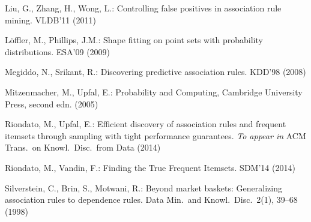 \begin{thebibliography}{33}
Liu, G., Zhang, H., Wong, L.: Controlling false positives in association rule
  mining.
\newblock VLDB'11 (2011)

L\"{o}ffler, M., Phillips, J.M.: Shape fitting on point sets with probability
  distributions.
\newblock ESA'09 (2009)

Megiddo, N., Srikant, R.: Discovering predictive association rules.
\newblock KDD'98 (2008)

  Mitzenmacher, M., Upfal, E.: Probability and Computing,  
  \newblock Cambridge University Press, second edn. (2005)

Riondato, M., Upfal, E.: Efficient discovery of association rules and frequent
  itemsets through sampling with tight performance guarantees.
\newblock \emph{To appear in} ACM Trans.~on Knowl.~Disc.~from Data  (2014)

Riondato, M., Vandin, F.: Finding the True Frequent Itemsets.
\newblock SDM'14 (2014)

Silverstein, C., Brin, S., Motwani, R.: Beyond market baskets: Generalizing
  association rules to dependence rules.
\newblock Data Min.~and Knowl.~Disc.~2(1), 39--68 (1998)%

\iffalse
\bibitem[{Teytaud and Lallich(2001)}]{TeytaudL01}
Teytaud, O., Lallich, S.: Contribution of statistical learning to validation of
  association rules (2001)%
 \fi


\end{thebibliography}
